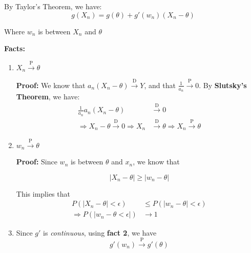 \documentclass{article}
\begin{document}
    By Taylor's Theorem, we have:
    \begin{equation*}
        g(X_n) = g(\theta) + g'(w_n)(X_n-\theta)
    \end{equation*}
    
    Where $w_n$ is between $X_n$ and $\theta$
    
    \textbf{Facts:}
    \begin{enumerate}
        \item $X_n \xrightarrow{\text{P}} \theta$
        
        \textbf{Proof:} We know that $a_n(X_n-\theta)\xrightarrow{\text{D}} Y$, and that $\frac{1}{a_n}\xrightarrow{\text{P}} 0$. By \textbf{Slutsky's Theorem}, we have:
        \begin{equation*}
            \begin{split}
                \frac{1}{a_n}a_n(X_n-\theta) &\xrightarrow{\text{D}} 0\\
                \Rightarrow X_n - \theta \xrightarrow{\text{D}} 0 \Rightarrow X_n &\xrightarrow{\text{D}} \theta \Rightarrow X_n \xrightarrow{\text{P}}\theta
            \end{split}
        \end{equation*}
        
        \item $w_n \xrightarrow{\text{P}}\theta$ 
        
        \textbf{Proof:} Since $w_n$ is between $\theta$ and $x_n$, we know that
        
        \begin{equation*}
            |X_n-\theta| \geq |w_n -\theta|
        \end{equation*}
        
        This implies that
        \begin{equation*}
        \begin{split}
            P\left(|X_n - \theta| < \epsilon\right) &\leq P\left(|w_n - \theta| < \epsilon\right)\\
            \Rightarrow P(|w_n-\theta < \epsilon|) &\rightarrow 1
        \end{split}
        \end{equation*}
        
        \item Since $g'$ is \textit{continuous}, using \textbf{fact 2}, we have
        \begin{equation*}
            g'(w_n) \xrightarrow{\text{P}} g'(\theta)
        \end{equation*}
    \end{enumerate}
    
\end{document}
